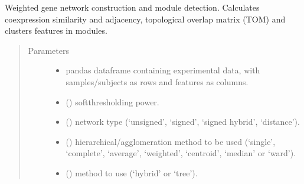 \documentclass[letterpaper,10pt,english]{sphinxmanual}
\begin{document}
\begin{fulllineitems}
\label{\detokenize{_autosummary/analytics_core.analytics:analytics_core.analytics.wgcnaAnalysis.build_network}}
Weighted gene network construction and module detection. Calculates co\sphinxhyphen{}expression similarity and adjacency, topological overlap matrix (TOM) and clusters features in modules.
\begin{quote}\begin{description}
\item[{Parameters}] \leavevmode\begin{itemize}
\item {} 
 \textendash{} pandas dataframe containing experimental data, with samples/subjects as rows and features as columns.

\item {} 
 () \textendash{} soft\sphinxhyphen{}thresholding power.

\item {} 
 () \textendash{} network type (‘unsigned’, ‘signed’, ‘signed hybrid’, ‘distance’).

\item {} 
 () \textendash{} hierarchical/agglomeration method to be used (‘single’, ‘complete’, ‘average’, ‘weighted’, ‘centroid’, ‘median’ or ‘ward’).

\item {} 
 () \textendash{} method to use (‘hybrid’ or ‘tree’).


\end{itemize}
\end{description}
\end{quote}
\end{fulllineitems}
\end{document}
